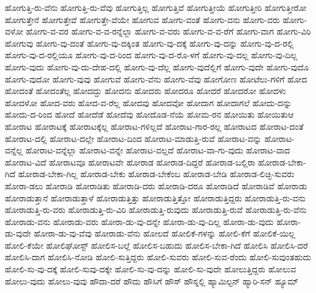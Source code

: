 {ಹೋಗುತ್ತಿ-ರು-ವೆನು
ಹೋಗುತ್ತಿ-ರು-ವೆವು
ಹೋಗುತ್ತಿಲ್ಲ
ಹೋಗುತ್ತಿವೆ
ಹೋಗುತ್ತೀಯೆ
ಹೋಗುತ್ತೀರಿ
ಹೋಗುತ್ತೀರೋ
ಹೋಗುತ್ತೇನೆ
ಹೋಗುತ್ತೇವೆ
ಹೋಗುತ್ತೇ-ವೆಯೇ
ಹೋಗುವ
ಹೋಗು-ವಂತೆ
ಹೋಗು-ವನು
ಹೋಗು-ವರು
ಹೋಗು-ವಳೋ
ಹೋಗು-ವ-ವರ
ಹೋಗು-ವ-ವ-ರನ್ನೆಲ್ಲಾ
ಹೋಗು-ವ-ವರು
ಹೋಗು-ವ-ವ-ರೆಗೆ
ಹೋಗು-ವಾಗ
ಹೋಗು-ವಿರಿ
ಹೋಗುವು
ಹೋಗು-ವು-ದಂತೆ
ಹೋಗು-ವು-ದಕ್ಕಿಂತ
ಹೋಗು-ವು-ದಕ್ಕೆ
ಹೋಗು-ವು-ದನ್ನು
ಹೋಗು-ವು-ದ-ರಲ್ಲಿ
ಹೋಗು-ವು-ದ-ರಲ್ಲಿಯೂ
ಹೋಗು-ವು-ದ-ರಿಂದ
ಹೋಗು-ವು-ದ-ರೊ-ಳಗೆ
ಹೋಗು-ವು-ದಲ್ಲ
ಹೋಗು-ವು-ದಿಲ್ಲ
ಹೋಗು-ವುದು
ಹೋಗು-ವು-ದು-ದೇಹ-ದಲ್ಲಿ
ಹೋಗು-ವು-ದೆಲ್ಲ
ಹೋಗು-ವುದೆಲ್ಲಿಗೆ
ಹೋಗು-ವುದೇ
ಹೋಗು-ವುದೊ
ಹೋಗು-ವುದೋ
ಹೋಗು-ವುವು
ಹೋಗುವೆ
ಹೋಗು-ವೆನು
ಹೋಗು-ವೆವು
ಹೋಗೋಣ
ಹೋಟೆಲು-ಗಳಿಗೆ
ಹೋದ
ಹೋದಂತೆ
ಹೋದಂತೆಲ್ಲ
ಹೋದದ್ದು
ಹೋದನು
ಹೋದರು
ಹೋದರೂ
ಹೋದರೆ
ಹೋದರೋ
ಹೋದಳು
ಹೋದಳೋ
ಹೋದ-ವರು
ಹೋದ-ವ-ರೆಲ್ಲ
ಹೋದವು
ಹೋದವೋ
ಹೋದಾಗ
ಹೋದಾಗಲೆ
ಹೋದು-ದನ್ನು
ಹೋದು-ದ-ರಿಂದ
ಹೋದೆ
ಹೋದೆಡೆ
ಹೋದೆವು
ಹೋದೊಡ-ನೆಯೆ
ಹೋಮ-ರನ
ಹೋಯಿತು
ಹೋಯಿತುಆ
ಹೋರಾಟ
ಹೋರಾಟಕ್ಕೆ
ಹೋರಾಟಕ್ಕೆಲ್ಲ
ಹೋರಾಟ-ಗಳಿಲ್ಲದೆ
ಹೋರಾಟ-ಗಾರ-ರಲ್ಲ
ಹೋರಾಟದ
ಹೋರಾಟ-ದಂತೆ
ಹೋರಾಟ-ದಲ್ಲಿ
ಹೋರಾಟ-ದಲ್ಲೇ
ಹೋರಾಟ-ದಿಂದ
ಹೋರಾಟ-ಮಾಡುತ್ತಿ-ರುವೆ
ಹೋರಾಟ-ವನ್ನು
ಹೋರಾಟ-ವನ್ನೆಲ್ಲ
ಹೋರಾಟ-ವನ್ನೆಲ್ಲಾ
ಹೋರಾಟ-ವನ್ನೇ
ಹೋರಾಟ-ವಲ್ಲದೆ
ಹೋರಾಟ-ವಾ-ಗು-ವುದು
ಹೋರಾಟ-ವಾದ
ಹೋರಾಟ-ವಿದೆ
ಹೋರಾಟವೂ
ಹೋರಾಟವೇ
ಹೋರಾಡ
ಹೋರಾಡ-ದಿದ್ದರೆ
ಹೋರಾಡ-ಬಲ್ಲಿರಾ
ಹೋರಾಡ-ಬೇಕಾ-ಗಿದೆ
ಹೋರಾಡ-ಬೇಕಾ-ಗಿಲ್ಲ
ಹೋರಾಡ-ಬೇಕು
ಹೋರಾಡ-ಬೇಕೆಂಬ
ಹೋರಾಡ-ಬೇಡಿ
ಹೋರಾಡ-ಲಿಚ್ಛಿ-ಸುವರು
ಹೋರಾ-ಡಲು
ಹೋರಾಡಿ
ಹೋರಾಡಿತು
ಹೋರಾಡಿ-ದರು
ಹೋರಾಡಿ-ದರೂ
ಹೋರಾಡಿದೆ
ಹೋರಾಡಿವೆ
ಹೋರಾಡು
ಹೋರಾಡುತ್ತಾನೆ
ಹೋರಾಡುತ್ತಾಳೆ
ಹೋರಾಡುತ್ತಿತ್ತು
ಹೋರಾಡುತ್ತಿತ್ತೋ
ಹೋರಾಡುತ್ತಿದ್ದರು
ಹೋರಾಡುತ್ತಿ-ರು-ವನು
ಹೋರಾಡುತ್ತಿ-ರು-ವರು
ಹೋರಾಡುತ್ತಿ-ರು-ವಿರಿ
ಹೋರಾಡುತ್ತಿ-ರುವುದು
ಹೋರಾಡುತ್ತಿ-ರುವೆ
ಹೋರಾಡುತ್ತಿ-ರು-ವೆನು
ಹೋರಾಡು-ವನು
ಹೋರಾಡು-ವರು
ಹೋರಾ-ಡು-ವು-ದನ್ನೇ
ಹೋರಾ-ಡು-ವು-ದಿಲ್ಲ
ಹೋರಾ-ಡು-ವುದು
ಹೋರಾ-ಡು-ವುದೇ
ಹೋರಾ-ಡು-ವು-ವೆವು
ಹೋರಾಡು-ವೆನು
ಹೋಲದೆ
ಹೋಲಿಕೆ-ಗಳನ್ನು
ಹೋಲಿ-ಕೆಗೆ
ಹೋಲಿಕೆ-ಯಿಲ್ಲ
ಹೋಲಿ-ಕೆಯೇ
ಹೋಲಿಘೋಸ್ಟ್
ಹೋಲಿಸ-ಬಲ್ಲೆ
ಹೋಲಿಸ-ಬಹುದು
ಹೋಲಿಸ-ಬೇಕಾ-ಗಿದೆ
ಹೋಲಿಸಿ
ಹೋಲಿಸಿ-ದರೆ
ಹೋಲಿಸಿ-ದಾಗ
ಹೋಲಿಸಿ-ನೋಡಿ
ಹೋಲಿ-ಸುತ್ತಿದ್ದರು
ಹೋಲಿ-ಸುವರು
ಹೋಲಿ-ಸುವ-ರೆಂದು
ಹೋಲಿ-ಸುವುಂತಹುದು
ಹೋಲಿ-ಸು-ವು-ದಕ್ಕೆ
ಹೋಲಿ-ಸುವು-ದಕ್ಕೇ
ಹೋಲಿ-ಸು-ವು-ದನ್ನು
ಹೋಲಿ-ಸು-ವುದೇ
ಹೋಲುತ್ತಿದ್ದರು
ಹೋಲುವ
ಹೋಲು-ವುದು
ಹೋಲು-ವುವು
ಹೌದಾ-ದರೆ
ಹೌದು
ಹೌಸಿಗೆ
ಹೌಸ್
ಹೌಸ್ನಲ್ಲಿ
ಹ್ಯಾಮಿಲ್ಟನ್
ಹ್ಯಾರಿ-ಸನ್
ಹ್ಯೂಮ್
}
